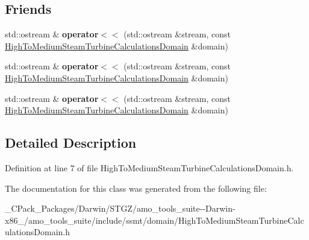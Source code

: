 \subsection*{Friends}
\begin{DoxyCompactItemize}
\item 
\mbox{\label{class_high_to_medium_steam_turbine_calculations_domain_a51828f48edb96651e0031fda1b14364d}} 
std\+::ostream \& {\bfseries operator$<$$<$} (std\+::ostream \&stream, const \hyperlink{class_high_to_medium_steam_turbine_calculations_domain}{High\+To\+Medium\+Steam\+Turbine\+Calculations\+Domain} \&domain)
\item 
\mbox{\label{class_high_to_medium_steam_turbine_calculations_domain_a51828f48edb96651e0031fda1b14364d}} 
std\+::ostream \& {\bfseries operator$<$$<$} (std\+::ostream \&stream, const \hyperlink{class_high_to_medium_steam_turbine_calculations_domain}{High\+To\+Medium\+Steam\+Turbine\+Calculations\+Domain} \&domain)
\item 
\mbox{\label{class_high_to_medium_steam_turbine_calculations_domain_a51828f48edb96651e0031fda1b14364d}} 
std\+::ostream \& {\bfseries operator$<$$<$} (std\+::ostream \&stream, const \hyperlink{class_high_to_medium_steam_turbine_calculations_domain}{High\+To\+Medium\+Steam\+Turbine\+Calculations\+Domain} \&domain)
\end{DoxyCompactItemize}


\subsection{Detailed Description}


Definition at line 7 of file High\+To\+Medium\+Steam\+Turbine\+Calculations\+Domain.\+h.



The documentation for this class was generated from the following file\+:\begin{DoxyCompactItemize}
\item 
\+\_\+\+C\+Pack\+\_\+\+Packages/\+Darwin/\+S\+T\+G\+Z/amo\+\_\+tools\+\_\+suite-\/-\/\+Darwin-\/x86\+\_/amo\+\_\+tools\+\_\+suite/include/ssmt/domain/High\+To\+Medium\+Steam\+Turbine\+Calculations\+Domain.\+h\end{DoxyCompactItemize}
